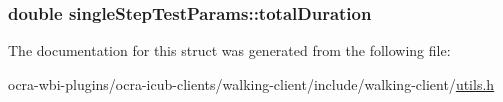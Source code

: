 \hypertarget{structsingleStepTestParams_a64dfd6827254af3491d5ef777a365106}{
\subsubsection[{total\-Duration}]{\setlength{\rightskip}{0pt plus 5cm}double {\bf single\-Step\-Test\-Params\-::total\-Duration}}}\label{structsingleStepTestParams_a64dfd6827254af3491d5ef777a365106}


\-The documentation for this struct was generated from the following file\-:\begin{DoxyCompactItemize}
\item 
ocra-\/wbi-\/plugins/ocra-\/icub-\/clients/walking-\/client/include/walking-\/client/\hyperlink{utils_8h}{utils.\-h}\end{DoxyCompactItemize}
